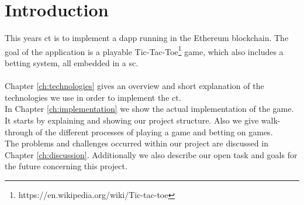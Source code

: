 \chapter{Introduction}\label{ch:introduction}
This years \ac{ct} is to implement a \ac{dapp}  running in the Ethereum blockchain. The goal of the application is a playable Tic-Tac-Toe\footnote{https://en.wikipedia.org/wiki/Tic-tac-toe} game, which also includes a betting system, all embedded in a \ac{sc}.
\\\\

Chapter \ref{ch:technologies} gives an overview and short explanation of the technologies we use in order to implement the \ac{ct}.\\
In Chapter \ref{ch:implementation} we show the actual implementation of the game. It starts by explaining and showing our project structure. Also we give walk-through of the different processes of playing a game and betting on games.\\
The problems and challenges occurred within our project are discussed in Chapter \ref{ch:discussion}. Additionally we also describe our open task and goals for the future concerning this project.